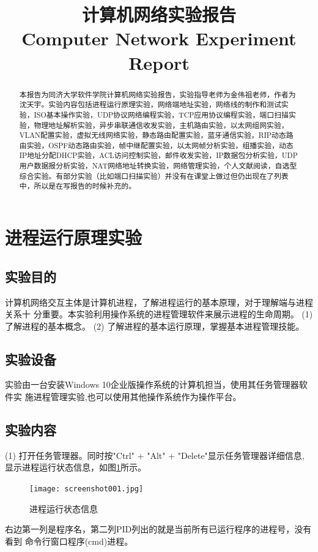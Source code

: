 \documentclass[lang=cn,11pt,a4paper,cite=authoryear]{elegantpaper}
\title{计算机网络实验报告\\
	
\small{Computer Network Experiment Report}
}
\author{}
\institute{\href{http://imsty.cn/}{沈天宇 \\ 1851521}}
\date{\zhtoday}
\begin{document}
\maketitle

\begin{abstract}
本报告为同济大学软件学院计算机网络实验报告，实验指导老师为金伟祖老师，作者为沈天宇。实验内容包括进程运行原理实验，网络端地址实验，网络线的制作和测试实验，ISO基本操作实验，UDP协议网络编程实验，TCP应用协议编程实验，端口扫描实验，物理地址解析实验，异步串联通信收发实验，主机路由实验，以太网组网实验，VLAN配置实验，虚拟无线网络实验，静态路由配置实验，蓝牙通信实验，RIP动态路由实验，OSPF动态路由实验，帧中继配置实验，以太网帧分析实验，组播实验，动态IP地址分配DHCP实验，ACL访问控制实验，邮件收发实验，IP数据包分析实验，UDP用户数据报分析实验，NAT网络地址转换实验，网络管理实验，个人文献阅读，自选型综合实验。有部分实验（比如端口扫描实验）并没有在课堂上做过但仍出现在了列表中，所以是在写报告的时候补充的。

\end{abstract}
\tableofcontents


\section{进程运行原理实验}
\subsection{实验目的}
计算机网络交互主体是计算机进程，了解进程运行的基本原理，对于理解端与进程关系十 分重要。本实验利用操作系统的进程管理软件来展示进程的生命周期。
(1)	了解进程的基本概念。
(2)	了解进程的基本运行原理，掌握基本进程管理技能。

\subsection{实验设备}
实验由一台安装Windows 10企业版操作系统的计算机担当，使用其任务管理器软件实 施进程管理实验,也可以使用其他操作系统作为操作平台。
\subsection{实验内容}
(1) 打开任务管理器。同时按"Ctrl" + "Alt" + "Delete"显示任务管理器详细信息, 显示进程运行状态信息，如图\ref{fig:renwu}所示。

\begin{figure}[htbp]
	\centering
	\texttt{[image: screenshot001.jpg]}
	\caption{进程运行状态信息}
	\label{fig:renwu}
\end{figure}
右边第一列是程序名，第二列PID列出的就是当前所有已运行程序的进程号，没有看到 命令行窗口程序(cmd)进程。
\end{document}
